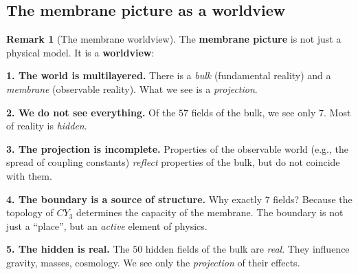 \documentclass[11pt,a4paper]{article}
\newcommand{\CY}{CY_3}
\theoremstyle{definition}
\newtheorem{remark}[theorem]{Remark}
\begin{document}
\subsection{The membrane picture as a worldview}
\label{subsec:membrane-worldview}

\begin{remark}[The membrane worldview]
\label{rem:membrane-worldview}
The \textbf{membrane picture} is not just a physical model. 
It is a \textbf{worldview}:

\medskip\noindent
\textbf{1. The world is multilayered.}
There is a \emph{bulk} (fundamental reality) and a \emph{membrane} 
(observable reality). What we see is a \emph{projection}.

\medskip\noindent
\textbf{2. We do not see everything.}
Of the $57$ fields of the bulk, we see only $7$. Most of 
reality is \emph{hidden}.

\medskip\noindent
\textbf{3. The projection is incomplete.}
Properties of the observable world (e.g., the spread of coupling constants) 
\emph{reflect} properties of the bulk, but do not coincide with them.

\medskip\noindent
\textbf{4. The boundary is a source of structure.}
Why exactly $7$ fields? Because the topology of $\CY$ determines 
the capacity of the membrane. The boundary is not just a ``place'', but 
an \emph{active} element of physics.

\medskip\noindent
\textbf{5. The hidden is real.}
The $50$ hidden fields of the bulk are \emph{real}. They influence 
gravity, masses, cosmology. We see only the \emph{projection} 
of their effects.
\end{remark}
\end{document}
